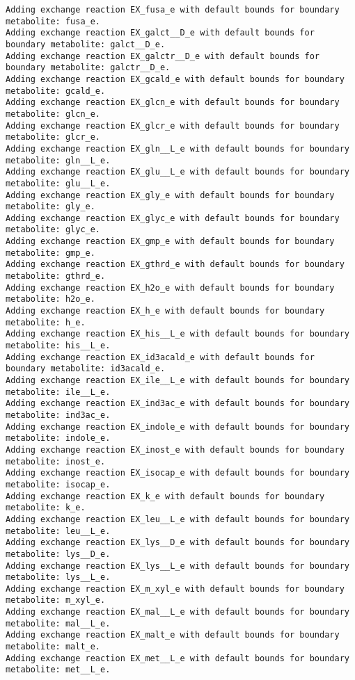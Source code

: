 \documentclass[
  letterpaper,
  DIV=11,
  numbers=noendperiod]{scrartcl}
\begin{document}
\begin{verbatim}
Adding exchange reaction EX_fusa_e with default bounds for boundary metabolite: fusa_e.
Adding exchange reaction EX_galct__D_e with default bounds for boundary metabolite: galct__D_e.
Adding exchange reaction EX_galctr__D_e with default bounds for boundary metabolite: galctr__D_e.
Adding exchange reaction EX_gcald_e with default bounds for boundary metabolite: gcald_e.
Adding exchange reaction EX_glcn_e with default bounds for boundary metabolite: glcn_e.
Adding exchange reaction EX_glcr_e with default bounds for boundary metabolite: glcr_e.
Adding exchange reaction EX_gln__L_e with default bounds for boundary metabolite: gln__L_e.
Adding exchange reaction EX_glu__L_e with default bounds for boundary metabolite: glu__L_e.
Adding exchange reaction EX_gly_e with default bounds for boundary metabolite: gly_e.
Adding exchange reaction EX_glyc_e with default bounds for boundary metabolite: glyc_e.
Adding exchange reaction EX_gmp_e with default bounds for boundary metabolite: gmp_e.
Adding exchange reaction EX_gthrd_e with default bounds for boundary metabolite: gthrd_e.
Adding exchange reaction EX_h2o_e with default bounds for boundary metabolite: h2o_e.
Adding exchange reaction EX_h_e with default bounds for boundary metabolite: h_e.
Adding exchange reaction EX_his__L_e with default bounds for boundary metabolite: his__L_e.
Adding exchange reaction EX_id3acald_e with default bounds for boundary metabolite: id3acald_e.
Adding exchange reaction EX_ile__L_e with default bounds for boundary metabolite: ile__L_e.
Adding exchange reaction EX_ind3ac_e with default bounds for boundary metabolite: ind3ac_e.
Adding exchange reaction EX_indole_e with default bounds for boundary metabolite: indole_e.
Adding exchange reaction EX_inost_e with default bounds for boundary metabolite: inost_e.
Adding exchange reaction EX_isocap_e with default bounds for boundary metabolite: isocap_e.
Adding exchange reaction EX_k_e with default bounds for boundary metabolite: k_e.
Adding exchange reaction EX_leu__L_e with default bounds for boundary metabolite: leu__L_e.
Adding exchange reaction EX_lys__D_e with default bounds for boundary metabolite: lys__D_e.
Adding exchange reaction EX_lys__L_e with default bounds for boundary metabolite: lys__L_e.
Adding exchange reaction EX_m_xyl_e with default bounds for boundary metabolite: m_xyl_e.
Adding exchange reaction EX_mal__L_e with default bounds for boundary metabolite: mal__L_e.
Adding exchange reaction EX_malt_e with default bounds for boundary metabolite: malt_e.
Adding exchange reaction EX_met__L_e with default bounds for boundary metabolite: met__L_e.

\end{verbatim}
\end{document}
